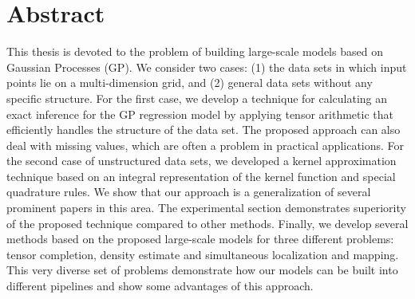 \chapter{Abstract}
\label{chap:abstract}

This thesis is devoted to the problem of building large-scale models based on
Gaussian Processes (GP).
We consider two cases: (1) the data sets in which input points lie on a multi-dimension grid,
and (2) general data sets without any specific structure.
For the first case, we develop a technique for calculating an exact inference for the GP regression
model by applying tensor arithmetic that efficiently handles the structure of the data set.
The proposed approach can also deal with missing values, which are often a problem in practical applications.
For the second case of unstructured data sets, we developed a kernel approximation technique
based on an integral representation of the kernel function and special quadrature rules.
We show that our approach is a generalization of several prominent papers in this area.
The experimental section demonstrates superiority of the proposed technique compared to other
methods.
Finally, we develop several methods based on the proposed large-scale models for
three different problems: tensor completion, density estimate and simultaneous localization
and mapping.
This very diverse set of problems demonstrate how our models can be built into different pipelines and show some advantages of this approach.